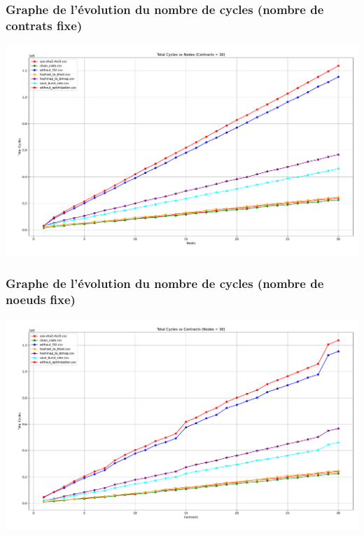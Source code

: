 \documentclass[aspectratio=169]{beamer}
\begin{document}
\begin{frame}
  \frametitle{Graphe de l'évolution du nombre de cycles (nombre de contrats fixe)}
  \begin{center}
    \includegraphics[scale=0.25]{benchmark_contracts.pdf}
  \end{center}
\end{frame}

\begin{frame}
  \frametitle{Graphe de l'évolution du nombre de cycles (nombre de noeuds fixe)}
  \begin{center}
    \includegraphics[scale=0.25]{benchmark_nodes.pdf}
  \end{center}
\end{frame}
\end{document}
